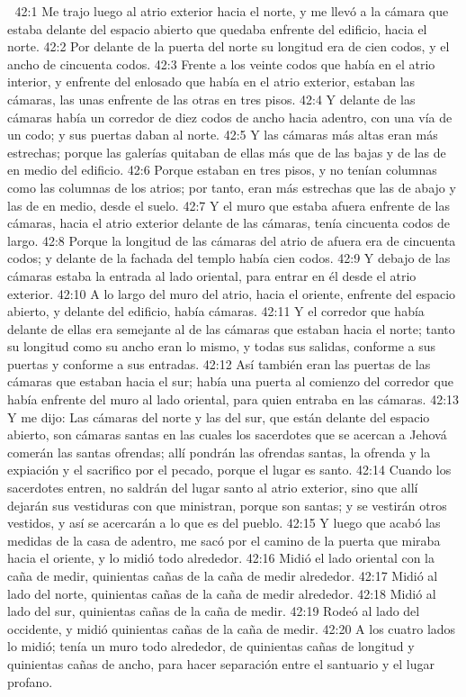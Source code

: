 
42:1 Me trajo luego al atrio exterior hacia el norte, y me llevó a la cámara que estaba delante del espacio abierto que quedaba enfrente del edificio, hacia el norte.  
42:2 Por delante de la puerta del norte su longitud era de cien codos,  y el ancho de cincuenta codos.  
42:3 Frente a los veinte codos   que había en el atrio interior, y enfrente del enlosado que había en el atrio exterior, estaban las cámaras, las unas enfrente de las otras en tres pisos.  
42:4 Y delante de las cámaras había un corredor de diez codos de ancho hacia adentro, con una vía de un codo; y sus puertas daban al norte.  
42:5 Y las cámaras más altas eran más estrechas; porque las galerías quitaban de ellas más que de las bajas y de las de en medio del edificio.  
42:6 Porque estaban en tres pisos, y no tenían columnas como las columnas de los atrios; por tanto, eran más estrechas que las de abajo y las de en medio, desde el suelo.  
42:7 Y el muro que estaba afuera enfrente de las cámaras, hacia el atrio exterior delante de las cámaras, tenía cincuenta codos   de largo.  
42:8 Porque la longitud de las cámaras del atrio de afuera era de cincuenta codos;  y delante de la fachada del templo había cien codos.  
42:9 Y debajo de las cámaras estaba la entrada al lado oriental, para entrar en él desde el atrio exterior.  
42:10 A lo largo del muro del atrio, hacia el oriente, enfrente del espacio abierto, y delante del edificio, había cámaras.  
42:11 Y el corredor que había delante de ellas era semejante al de las cámaras que estaban hacia el norte; tanto su longitud como su ancho eran lo mismo, y todas sus salidas, conforme a sus puertas y conforme a sus entradas.  
42:12 Así también eran las puertas de las cámaras que estaban hacia el sur; había una puerta al comienzo del corredor que había enfrente del muro al lado oriental, para quien entraba en las cámaras.  
42:13 Y me dijo: Las cámaras del norte y las del sur, que están delante del espacio abierto, son cámaras santas en las cuales los sacerdotes que se acercan a Jehová comerán las santas ofrendas; allí pondrán las ofrendas santas, la ofrenda y la expiación y el sacrifico por el pecado, porque el lugar es santo.  
42:14 Cuando los sacerdotes entren, no saldrán del lugar santo al atrio exterior, sino que allí dejarán sus vestiduras con que ministran, porque son santas; y se vestirán otros vestidos, y así se acercarán a lo que es del pueblo.  
42:15 Y luego que acabó las medidas de la casa de adentro, me sacó por el camino de la puerta que miraba hacia el oriente, y lo midió todo alrededor.  
42:16 Midió el lado oriental con la caña de medir, quinientas cañas   de la caña de medir alrededor.  
42:17 Midió al lado del norte, quinientas cañas   de la caña de medir alrededor.  
42:18 Midió al lado del sur, quinientas cañas   de la caña de medir.  
42:19 Rodeó al lado del occidente, y midió quinientas cañas   de la caña de medir.  
42:20 A los cuatro lados lo midió; tenía un muro todo alrededor, de quinientas cañas   de longitud y quinientas cañas de ancho, para hacer separación entre el santuario y el lugar profano. 

